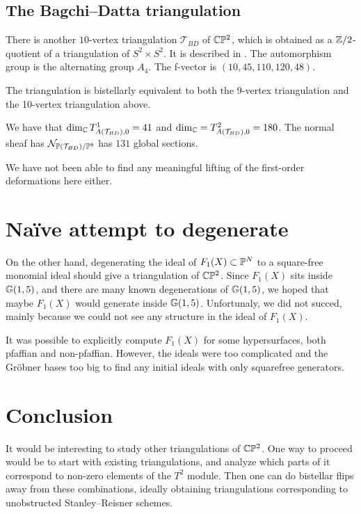 \subsection{The Bagchi--Datta triangulation}

There is another $10$-vertex triangulation $\mathcal T_{BD}$ of $\C \P^2$, which is obtained as a $\Z/2$-quotient of a triangulation of $S^2 \times S^2$. It is described in \cite{bagchi_datta}. The automorphism group is the alternating group $A_4$. The f-vector is $(10,45,110,120,48)$.

The triangulation is bistellarly equivalent to both the 9-vertex triangulation and the 10-vertex triangulation above.

\begin{proposition}
We have that $\dim_\C  T^1_{A(\mathcal T_{BD}),0}=41$ and $\dim_\C = T^2_{A(\mathcal T_{BD}),0}=180$. The normal sheaf has $\mathcal N_{\P(\mathcal T_{BD})/\P^{8}}$ has $131$ global sections.
\end{proposition}

We have not been able to find any meaningful lifting of the first-order deformations here either.

\section{Naïve attempt to degenerate}

On the other hand, degenerating the ideal of $F_1(X) \subset \P^N$ to a square-free monomial ideal should give a triangulation of $\C \P^2$. Since $F_1(X)$ sits inside $\Gr(1,5)$, and there are many known degenerations of $\Gr(1,5)$, we hoped that maybe $F_1(X)$ would generate inside $\Gr(1,5)$. Unfortunaly, we did not succed, mainly because we could not see any structure in the ideal of $F_1(X)$.


It was possible to explicitly compute $F_1(X)$ for some hypersurfaces, both pfaffian and non-pfaffian. However, the ideals were too complicated and the Gröbner bases too big to find any initial ideals with only squarefree generators.

\section{Conclusion} %

It would be interesting to study other triangulations of $\C \P^2$. One way to proceed would be to start with existing triangulations, and analyze which parts of it correspond to non-zero elements of the $T^2$ module. Then one can do bistellar flips away from these combinations, ideally obtaining triangulations corresponding to unobstructed Stanley--Reisner schemes.

